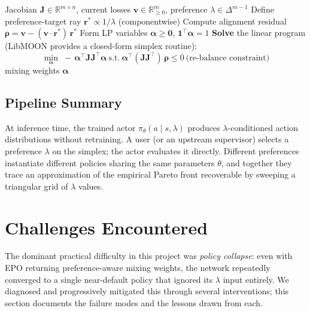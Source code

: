 \documentclass[12pt, letterpaper]{article}
\begin{document}
\begin{algorithm}[!ht]
\caption{\textsc{EPO}: linear programming for Pareto-stationary mixing weights \cite{mahapatra2020epo}}
\label{alg:epo}
\begin{algorithmic}[1]
\Require Jacobian $\bm{J} \in \mathbb{R}^{m\times n}$, current losses $\bm{v} \in \mathbb{R}^{m}_{\ge 0}$, preference $\lambda \in \Delta^{m-1}$
\State Define preference-target ray $\bm{r}^{*} \propto 1 / \lambda$ (componentwise)
\State Compute alignment residual $\bm{\rho} = \bm{v} - (\bm{v} \cdot \bm{r}^{*})\,\bm{r}^{*}$
\State Form LP variables $\bm{\alpha} \ge \bm{0}$, $\bm{1}^{\top}\bm{\alpha} = 1$
\State \textbf{Solve} the linear program (LibMOON \cite{zhang2024libmoon} provides a closed-form simplex routine):
\begin{equation*}
    \min_{\bm{\alpha}}\; -\,\bm{\alpha}^{\top}\bm{J}\bm{J}^{\top}\bm{\alpha}\ \text{s.t.}\ \bm{\alpha}^{\top}(\bm{J}\bm{J}^{\top})\,\bm{\rho} \le 0\ \text{(re-balance constraint)}
\end{equation*}
\State \Return mixing weights $\bm{\alpha}$
\end{algorithmic}
\end{algorithm}

\subsection{Pipeline Summary}
At inference time, the trained actor $\pi_\theta(a\mid s, \lambda)$ produces $\lambda$-conditioned action distributions without retraining. A user (or an upstream supervisor) selects a preference $\lambda$ on the simplex; the actor evaluates it directly. Different preferences instantiate different policies sharing the same parameters $\theta$, and together they trace an approximation of the empirical Pareto front recoverable by sweeping a triangular grid of $\lambda$ values.

\section{Challenges Encountered}
\label{sec:challenges}

The dominant practical difficulty in this project was \emph{policy collapse}: even with EPO returning preference-aware mixing weights, the network repeatedly converged to a single near-default policy that ignored its $\lambda$ input entirely. We diagnosed and progressively mitigated this through several interventions; this section documents the failure modes and the lessons drawn from each.
\end{document}
